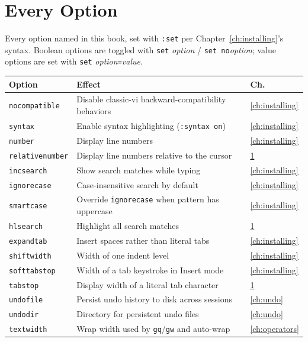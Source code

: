 \chapter{Every Option}
\label{app:options}

Every option named in this book, set with \texttt{:set} per Chapter~\ref{ch:installing}'s syntax. Boolean options are toggled with \texttt{set} \textit{option} / \texttt{set no}\textit{option}; value options are set with \texttt{set} \textit{option}\texttt{=}\textit{value}.

\begin{longtable}{@{}l p{9cm} l@{}}
\textbf{Option} & \textbf{Effect} & \textbf{Ch.} \\
\hline
\endhead
\texttt{nocompatible} & Disable classic-vi backward-compatibility behaviors & \ref{ch:installing} \\
\texttt{syntax} & Enable syntax highlighting (\texttt{:syntax on}) & \ref{ch:installing} \\
\texttt{number} & Display line numbers & \ref{ch:installing} \\
\texttt{relativenumber} & Display line numbers relative to the cursor & \ref{app:options} \\
\texttt{incsearch} & Show search matches while typing & \ref{ch:installing} \\
\texttt{ignorecase} & Case-insensitive search by default & \ref{ch:installing} \\
\texttt{smartcase} & Override \texttt{ignorecase} when pattern has uppercase & \ref{ch:installing} \\
\texttt{hlsearch} & Highlight all search matches & \ref{app:options} \\
\texttt{expandtab} & Insert spaces rather than literal tabs & \ref{ch:installing} \\
\texttt{shiftwidth} & Width of one indent level & \ref{ch:installing} \\
\texttt{softtabstop} & Width of a tab keystroke in Insert mode & \ref{ch:installing} \\
\texttt{tabstop} & Display width of a literal tab character & \ref{app:options} \\
\texttt{undofile} & Persist undo history to disk across sessions & \ref{ch:undo} \\
\texttt{undodir} & Directory for persistent undo files & \ref{ch:undo} \\
\texttt{textwidth} & Wrap width used by \texttt{gq}/\texttt{gw} and auto-wrap & \ref{ch:operators} \\

\end{longtable}
